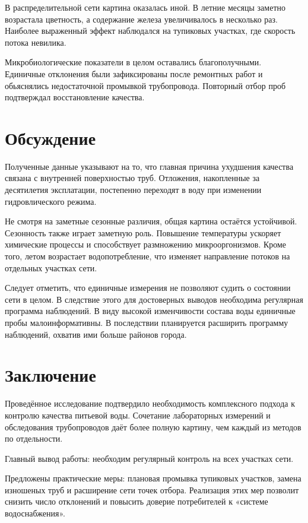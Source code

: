 В распределительной сети картина оказалась иной. В летние месяцы заметно
возрастала цветность, а содержание железа увеличивалось в несколько раз.
Наиболее выраженный эффект наблюдался на тупиковых участках, где скорость потока
невилика.

Микробиологические показатели в целом оставались благополучными. Единичные
отклонения были зафиксированы после ремонтных работ и обьяснялись недостаточной
промывкой трубопровода. Повторный отбор проб подтверждал восстановление
качества.

\chapter{Обсуждение}

Полученные данные указывают на то, что главная причина ухудшения качества
связана с внутренней поверхностью труб.
Отложения, накопленные за десятилетия эксплатации,
постепенно переходят в воду при изменении гидровлического режима.

Не смотря на заметные сезонные различия, общая картина остаётся устойчивой.
Сезонность также играет заметную роль. Повышение температуры ускоряет химические
процессы и способствует размножению микрооргонизмов. Кроме того, летом
возрастает водопотребление, что изменяет направление потоков на отдельных
участках сети.

Следует отметить, что единичные измерения не позволяют судить о состоянии сети в
целом. В следствие этого для достоверных выводов необходима регулярная программа
наблюдений. В виду высокой изменчивости состава воды единичные пробы
малоинформативны. В последствии планируется расширить программу наблюдений,
охватив ими больше районов города.

\chapter{Заключение}

Проведённое исследование подтвердило необходимость комплексного подхода к
контролю качества питьевой воды. Сочетание лабораторных измерений и обследования
трубопроводов даёт более полную картину, чем каждый из методов по отдельности.

Главный вывод работы: необходим регулярный контроль на всех участках сети.

Предложены практические меры: плановая промывка тупиковых участков, замена
изношеных труб и расширение сети точек отбора. Реализация этих мер позволит
снизить число отклонений и повысить доверие потребителей к «системе
водоснабжения».
